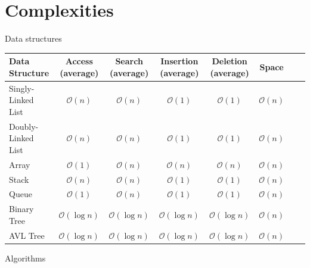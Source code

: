 \documentclass [12pt, executivepaper]{article}
\begin{document}
\section*{Complexities}

Data structures

\vspace{3mm}

\resizebox{\columnwidth}{!}
{

    \begin{tabular}{l*{6}{c}r}
    
    Data Structure & Access (average) & Search (average) & Insertion (average) & Deletion (average) & Space \\
    
    \hline
    
    Singly-Linked List & $\mathcal{O}(n)$ & $\mathcal{O}(n)$ & $\mathcal{O}(1)$ & $\mathcal{O}(1)$ & $\mathcal{O}(n)$  \\
    
    Doubly-Linked List & $\mathcal{O}(n)$ & $\mathcal{O}(n)$ & $\mathcal{O}(1)$ & $\mathcal{O}(1)$ & $\mathcal{O}(n)$  \\
    
    Array & $\mathcal{O}(1)$ & $\mathcal{O}(n)$ & $\mathcal{O}(n)$ & $\mathcal{O}(n)$ & $\mathcal{O}(n)$  \\
    
    Stack & $\mathcal{O}(n)$ & $\mathcal{O}(n)$ & $\mathcal{O}(1)$ & $\mathcal{O}(1)$ & $\mathcal{O}(n)$  \\
    
    Queue & $\mathcal{O}(1)$ & $\mathcal{O}(n)$ & $\mathcal{O}(1)$ & $\mathcal{O}(1)$ & $\mathcal{O}(n)$  \\
    
    Binary Tree & $\mathcal{O}(\log{} n)$ & $\mathcal{O}(\log{} n)$ & $\mathcal{O}(\log{} n)$ & $\mathcal{O}(\log{} n)$ & $\mathcal{O}(n)$  \\
    
    AVL Tree & $\mathcal{O}(\log{} n)$ & $\mathcal{O}(\log{} n)$ & $\mathcal{O}(\log{} n)$ & $\mathcal{O}(\log{} n)$ & $\mathcal{O}(n)$
    
    \end{tabular}
}

\vspace{3mm}

\hspace{-8mm} Algorithms
\end{document}
